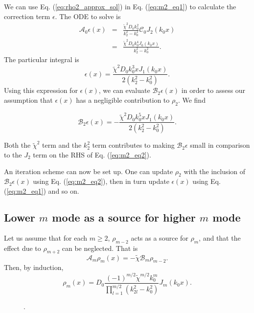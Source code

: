 \documentclass[apj]{emulateapj}
\newcommand{\Eq}[1]{Eq. (\ref{#1})}
\newcommand{\eq}[1]{\Eq{#1}}
\newcommand{\beq}{\begin{equation}}
\newcommand{\eeq}{\end{equation}}
\newcommand{\beqn}{\begin{eqnarray}}
\newcommand{\eeqn}{\end{eqnarray}}
\begin{document}
We can use \eq{eq:rho2_approx_sol} in \eq{eq:m2_eq1} to
calculate the correction term $\epsilon$. The ODE to solve is
\beqn
\mathcal{A}_0\epsilon(x)
&=&\frac{\tilde{\chi}^2D_0k_0^2}{k_2^2-k_0^2}\mathcal{C}_0J_2(k_0x) \nonumber \\ 
&=&\frac{\tilde{\chi}^2D_0k_0^4J_0(k_0x)}{k_2^2-k_0^2}.
\eeqn
The particular integral is 
\beq
\epsilon(x) = \frac{\tilde{\chi}^2D_0k_0^3xJ_1(k_0x)}{2\left(k_2^2 -
  k_0^2\right)}. 
\eeq
Using this expression for $\epsilon(x)$, we can evaluate
$\mathcal{B}_2\epsilon(x)$ in order to assess our assumption that
$\epsilon(x)$ has a negligible contribution to $\rho_2$. We find

\beq
\mathcal{B}_2\epsilon(x) =
-\frac{\tilde{\chi}^2D_0k_0^5xJ_1(k_0x)}{2\left(k_2^2 -
  k_0^2\right)}. 
\eeq

Both the $\tilde{\chi}^2$ term and the $k_2^2$ term contributes to
making $\mathcal{B}_2\epsilon$ small in comparison to the $J_2$ term
on the RHS of \eq{eq:m2_eq2}. 

An iteration scheme can now be set up. One can update
$\rho_2$ with the inclusion of $\mathcal{B}_2\epsilon(x)$ using
\eq{eq:m2_eq2}, then in turn update $\epsilon(x)$ using
\eq{eq:m2_eq1} and so on. 


\subsection{Lower $m$ mode as a source for higher $m$ mode}
Let us assume that for each $m\geq2$, $\rho_{m-2}$ acts as a source
for $\rho_{m}$, and that the effect due to $\rho_{m+2}$ can be
neglected. That is
\beq
\mathcal{A}_m\rho_m(x) = -\tilde{\chi}\mathcal{B}_m\rho_{m-2}. 
\eeq 
Then, by induction,
\beq
\rho_m(x) =D_0
\frac{(-1)^{m/2}\tilde{\chi}^{m/2}k_0^m}{\prod_{l=1}^{m/2}(k_{2l}^2-k_0^2)}J_m(k_0x). 
\eeq

\begin{figure}
  \begin{center}
  \end{center}
\caption[]{.}
 \label{fig:scale-function}
\end{figure}
\end{document}
